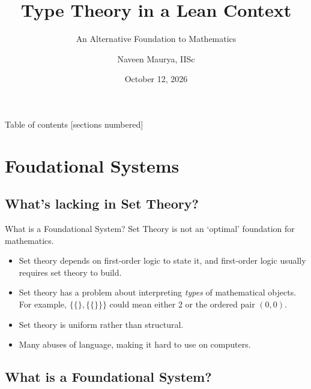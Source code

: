 \documentclass[10pt, aspectratio=169]{beamer}
\title{Type Theory in a Lean Context}
\subtitle{An Alternative Foundation to Mathematics}
\date{October 12, 2026}
\author{Naveen Maurya, IISc}
\institute{Feynman Lecture Hall, ICTS}
\newcommand{\0}{\mathbf{0}}
\newcommand{\1}{\mathbf{1}}
\newcommand{\2}{\mathbf{2}}
\begin{document}
\maketitle

\begin{frame}{Table of contents}
  [sections numbered]
  \tableofcontents[hideallsubsections]
\end{frame}

\section{Foudational Systems} 
 
\subsection{What's lacking in Set Theory?}

\begin{frame}{What is a Foundational System?}
  Set Theory is not an  `optimal' foundation for mathematics. 
  \begin{itemize}
    \item Set theory depends on first-order logic to state it, and first-order logic usually requires set theory to build.
    \item Set theory has a problem about interpreting \emph{types} of mathematical objects.\\
    For example, $\{\{\}, \{\{\}\}\}$ could mean either $2$ or the ordered pair $(0,0)$.
    \item Set theory is uniform rather than structural. 
    \item Many abuses of language, making it hard to use on computers. 
  \end{itemize}
\end{frame}


\subsection{What is a Foundational System?}
\end{document}

